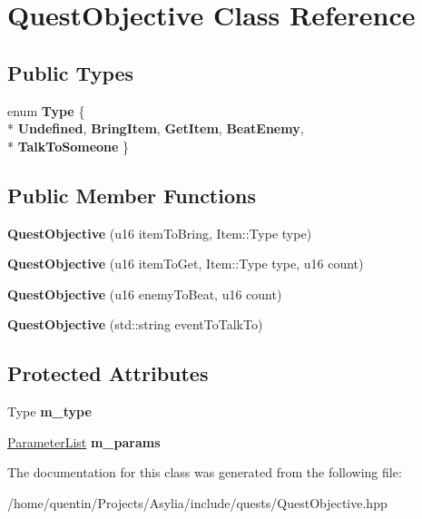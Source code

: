 \hypertarget{classQuestObjective}{\section{Quest\-Objective Class Reference}
\label{classQuestObjective}
}
\subsection*{Public Types}
\begin{DoxyCompactItemize}
\item 
enum {\bfseries Type} \{ \\*
{\bfseries Undefined}, 
{\bfseries Bring\-Item}, 
{\bfseries Get\-Item}, 
{\bfseries Beat\-Enemy}, 
\\*
{\bfseries Talk\-To\-Someone}
 \}
\end{DoxyCompactItemize}
\subsection*{Public Member Functions}
\begin{DoxyCompactItemize}
\item 
\hypertarget{classQuestObjective_a0608ed6e0fb3b82f670bedf4f1da32fc}{{\bfseries Quest\-Objective} (u16 item\-To\-Bring, Item\-::\-Type type)}\label{classQuestObjective_a0608ed6e0fb3b82f670bedf4f1da32fc}

\item 
\hypertarget{classQuestObjective_ad197a9e364a07e5388a4a48743633d6c}{{\bfseries Quest\-Objective} (u16 item\-To\-Get, Item\-::\-Type type, u16 count)}\label{classQuestObjective_ad197a9e364a07e5388a4a48743633d6c}

\item 
\hypertarget{classQuestObjective_a19542be0be15f37918ba27a232715eb5}{{\bfseries Quest\-Objective} (u16 enemy\-To\-Beat, u16 count)}\label{classQuestObjective_a19542be0be15f37918ba27a232715eb5}

\item 
\hypertarget{classQuestObjective_a5207c9132c4dd43e03829ea1ca2c76c7}{{\bfseries Quest\-Objective} (std\-::string event\-To\-Talk\-To)}\label{classQuestObjective_a5207c9132c4dd43e03829ea1ca2c76c7}

\end{DoxyCompactItemize}
\subsection*{Protected Attributes}
\begin{DoxyCompactItemize}
\item 
\hypertarget{classQuestObjective_a14066d424437ebce3cc48a9de012701e}{Type {\bfseries m\-\_\-type}}\label{classQuestObjective_a14066d424437ebce3cc48a9de012701e}

\item 
\hypertarget{classQuestObjective_a3a05cce8bb2766698e687f0c77380a83}{\hyperlink{classParameterList}{Parameter\-List} {\bfseries m\-\_\-params}}\label{classQuestObjective_a3a05cce8bb2766698e687f0c77380a83}

\end{DoxyCompactItemize}


The documentation for this class was generated from the following file\-:\begin{DoxyCompactItemize}
\item 
/home/quentin/\-Projects/\-Asylia/include/quests/Quest\-Objective.\-hpp\end{DoxyCompactItemize}
